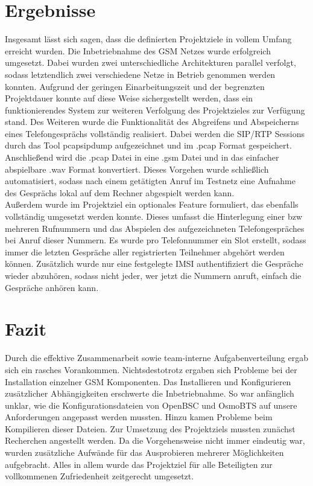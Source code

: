 \section{Ergebnisse} 
Insgesamt lässt sich sagen, dass die definierten Projektziele in vollem Umfang erreicht wurden. Die Inbetriebnahme des GSM Netzes wurde erfolgreich umgesetzt. Dabei wurden zwei unterschiedliche Architekturen parallel verfolgt, sodass letztendlich zwei verschiedene Netze in Betrieb genommen werden konnten. Aufgrund der geringen Einarbeitungszeit und der begrenzten Projektdauer konnte auf diese Weise sichergestellt werden, dass ein funktionierendes System zur weiteren Verfolgung des Projektzieles zur Verfügung stand. Des Weiteren wurde die Funktionalität des Abgreifens und Abspeicherns eines Telefongesprächs vollständig realisiert. Dabei werden die SIP/RTP Sessions durch das Tool pcapsipdump aufgezeichnet und im .pcap Format gespeichert. Anschließend wird die .pcap Datei in eine .gsm Datei und in das einfacher abspielbare .wav Format konvertiert. Dieses Vorgehen wurde schließlich automatisiert, sodass nach einem getätigten Anruf im Testnetz eine Aufnahme des Gesprächs lokal auf dem Rechner abgespielt werden kann.\\

Außerdem wurde im Projektziel ein optionales Feature formuliert, das ebenfalls vollständig umgesetzt werden konnte. Dieses umfasst die Hinterlegung einer bzw mehreren Rufnummern und das Abspielen des aufgezeichneten Telefongespräches bei Anruf dieser Nummern. Es wurde pro Telefonnummer ein Slot erstellt, sodass immer die letzten Gespräche aller registrierten Teilnehmer abgehört werden können. Zusätzlich wurde nur eine festgelegte IMSI authentifiziert die Gespräche wieder abzuhören, sodass nicht jeder, wer jetzt die Nummern anruft, einfach die Gespräche anhören kann.

\section{Fazit}
Durch die effektive Zusammenarbeit sowie team-interne Aufgabenverteilung ergab sich ein rasches Vorankommen. Nichtsdestotrotz ergaben sich Probleme bei der Installation einzelner GSM Komponenten. Das Installieren und Konfigurieren zusätzlicher Abhängigkeiten erschwerte die Inbetriebnahme. So war anfänglich unklar, wie die Konfigurationsdateien von OpenBSC und OsmoBTS auf unsere Anforderungen angepasst werden mussten. Hinzu kamen Probleme beim Kompilieren dieser Dateien. Zur Umsetzung des Projektziels mussten zunächst Recherchen angestellt werden. Da die Vorgehensweise nicht immer eindeutig war, wurden zusätzliche Aufwände für das Ausprobieren mehrerer Möglichkeiten aufgebracht. Alles in allem wurde das Projektziel für alle Beteiligten zur vollkommenen Zufriedenheit zeitgerecht umgesetzt.


